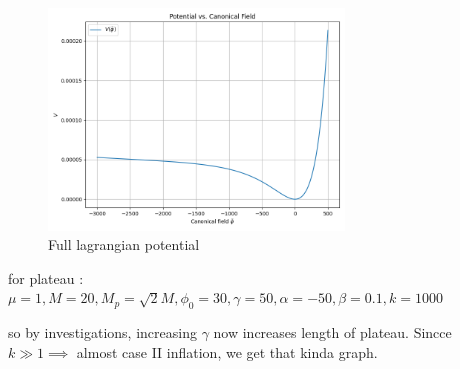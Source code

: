\documentclass{article}
\begin{document}
\begin{figure}[h!]
    \centering
    \includegraphics[width=0.7\textwidth]{Python/Figures/Full lagriangian potential.png}
    \caption{Full lagrangian potential}
    \label{Full lagrangian potential}
\end{figure}


for plateau : $\mu = 1, M = 20  ,M_p = \sqrt2 M ,\phi_0 = 30, \gamma = 50 ,\alpha = -50 ,\beta = 0.1 ,k = 1000$

so by investigations, increasing $\gamma$ now increases length of plateau. Sincce $k \gg 1 \implies$ almost case II inflation, we get that kinda graph.

\newpage

\printbibliography
\end{document}
